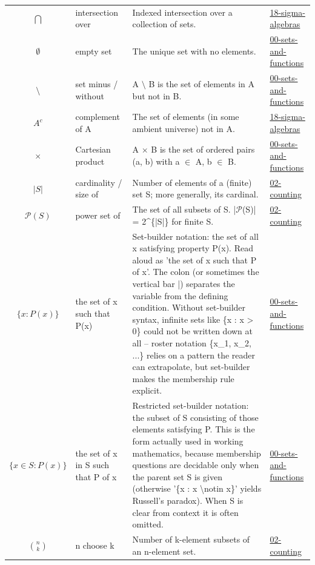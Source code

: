 \documentclass[10pt]{article}
\begin{document}
\begin{longtable}{@{} >{$}c<{$} l p{6.5cm} l @{}}
\bigcap & intersection over & Indexed intersection over a collection of sets. & \href{https://github.com/pleyva2004/math-foundations/tree/main/concepts/18-sigma-algebras}{18-sigma-algebras} \\
\emptyset & empty set & The unique set with no elements. & \href{https://github.com/pleyva2004/math-foundations/tree/main/concepts/00-sets-and-functions}{00-sets-and-functions} \\
\setminus & set minus / without & A $\setminus$ B is the set of elements in A but not in B. & \href{https://github.com/pleyva2004/math-foundations/tree/main/concepts/00-sets-and-functions}{00-sets-and-functions} \\
A^c & complement of A & The set of elements (in some ambient universe) not in A. & \href{https://github.com/pleyva2004/math-foundations/tree/main/concepts/18-sigma-algebras}{18-sigma-algebras} \\
\times & Cartesian product & A $\times$ B is the set of ordered pairs (a, b) with a $\in$ A, b $\in$ B. & \href{https://github.com/pleyva2004/math-foundations/tree/main/concepts/00-sets-and-functions}{00-sets-and-functions} \\
|S| & cardinality / size of & Number of elements of a (finite) set S; more generally, its cardinal. & \href{https://github.com/pleyva2004/math-foundations/tree/main/concepts/02-counting}{02-counting} \\
\mathcal{P}(S) & power set of & The set of all subsets of S. |$\mathcal{P}$(S)| = 2\textasciicircum{}\{|S|\} for finite S. & \href{https://github.com/pleyva2004/math-foundations/tree/main/concepts/02-counting}{02-counting} \\
\{x : P(x)\} & the set of x such that P(x) & Set-builder notation: the set of all x satisfying property P(x). Read aloud as 'the set of x such that P of x'. The colon (or sometimes the vertical bar |) separates the variable from the defining condition. Without set-builder syntax, infinite sets like \{x : x > 0\} could not be written down at all -- roster notation \{x\_1, x\_2, ...\} relies on a pattern the reader can extrapolate, but set-builder makes the membership rule explicit. & \href{https://github.com/pleyva2004/math-foundations/tree/main/concepts/00-sets-and-functions}{00-sets-and-functions} \\
\{x \in S : P(x)\} & the set of x in S such that P of x & Restricted set-builder notation: the subset of S consisting of those elements satisfying P. This is the form actually used in working mathematics, because membership questions are decidable only when the parent set S is given (otherwise '\{x : x \textbackslash{}notin x\}' yields Russell's paradox). When S is clear from context it is often omitted. & \href{https://github.com/pleyva2004/math-foundations/tree/main/concepts/00-sets-and-functions}{00-sets-and-functions} \\
\binom{n}{k} & n choose k & Number of k-element subsets of an n-element set. & \href{https://github.com/pleyva2004/math-foundations/tree/main/concepts/02-counting}{02-counting} \\
\end{longtable}
\end{document}
